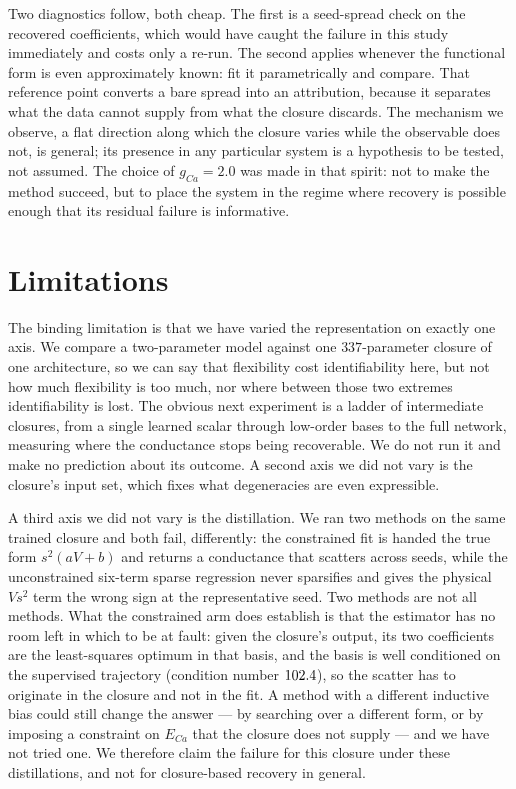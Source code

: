 \documentclass{article}
\newcommand{\NparamUde}{337}   %
\newcommand{\gcaMain}{2.0}     %
\begin{document}
Two diagnostics follow, both cheap. The first is a seed-spread check on the
recovered coefficients, which would have caught the failure in this study
immediately and costs only a re-run. The second applies whenever the functional
form is even approximately known: fit it parametrically and compare. That
reference point converts a bare spread into an attribution, because it separates
what the data cannot supply from what the closure discards. The mechanism we
observe, a flat direction along which the closure varies while the observable does
not, is general; its presence in any particular system is a hypothesis to be
tested, not assumed. The choice of $g_{Ca}=\gcaMain$ was made in that spirit: not
to make the method succeed, but to place the system in the regime where recovery
is possible enough that its residual failure is informative.

\section{Limitations}
\label{sec:limitations}

The binding limitation is that we have varied the representation on exactly one
axis. We compare a two-parameter model against one $\NparamUde$-parameter
closure of one architecture, so we can say that flexibility cost identifiability
here, but not how much flexibility is too much, nor where between those two
extremes identifiability is lost. The obvious next experiment is a ladder of
intermediate closures, from a single learned scalar through low-order bases to
the full network, measuring where the conductance stops being recoverable. We do
not run it and make no prediction about its outcome. A second axis we did not
vary is the closure's input set, which fixes what degeneracies are even
expressible.

A third axis we did not vary is the distillation. We ran two methods on the same
trained closure and both fail, differently: the constrained fit is handed the
true form $s^2(aV+b)$ and returns a conductance that scatters across seeds, while
the unconstrained six-term sparse regression never sparsifies and gives the
physical $Vs^2$ term the wrong sign at the representative seed. Two methods are
not all methods. What the constrained arm does establish is that the estimator
has no room left in which to be at fault: given the closure's output, its two
coefficients are the least-squares optimum in that basis, and the basis is well
conditioned on the supervised trajectory (condition number
$102.4$), so the scatter has to originate in the closure and
not in the fit. A method with a different inductive
bias could still change the answer --- by searching over a different form, or by
imposing a constraint on $E_{Ca}$ that the closure does not supply --- and we
have not tried one. We therefore claim the failure for this closure under these
distillations, and not for closure-based recovery in general.
\end{document}
